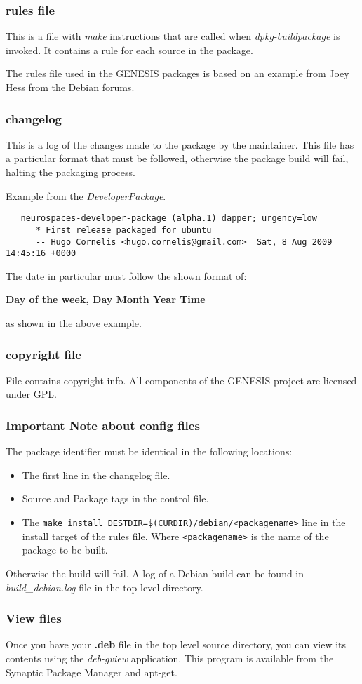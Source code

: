 \documentclass[12pt]{article}
\begin{document}
\subsubsection*{rules file}

This is a file with {\it make} instructions that are called when {\it dpkg-buildpackage} is invoked. It contains a rule for each source in the package.

The rules file used in the GENESIS packages is based on an example from Joey Hess from the Debian forums.

\subsubsection*{changelog}

This is a log of the changes made to the package by the maintainer. This file has a particular format that must be followed, otherwise the package build will fail, halting the packaging process.

Example from the {\it DeveloperPackage}.
\begin{verbatim}
   neurospaces-developer-package (alpha.1) dapper; urgency=low
      * First release packaged for ubuntu
      -- Hugo Cornelis <hugo.cornelis@gmail.com>  Sat, 8 Aug 2009 14:45:16 +0000
\end{verbatim}

The date in particular must follow the shown format of:

    {\bf Day of the week, Day Month Year Time} 

as shown in the above example.

\subsubsection*{copyright file}

File contains copyright info. All components of the GENESIS project are licensed under GPL.

\subsubsection*{Important Note about config files}

The package identifier must be identical in the following locations:
\begin{itemize}
   \item The first line in the changelog file.
   \item Source and Package tags in the control file.
   \item The {\tt make install DESTDIR=\$(CURDIR)/debian/<packagename>} line in the install target of the rules file. Where {\tt <packagename>} is the name of the package to be built. 
\end{itemize}
Otherwise the build will fail. A log of a Debian build can be found in {\it build\_debian.log} file in the top level directory.

\subsubsection*{View files}

Once you have your {\bf .deb} file in the top level source directory, you can view its contents using the {\it deb-gview} application. This program is available from the Synaptic Package Manager and apt-get.
\end{document}
